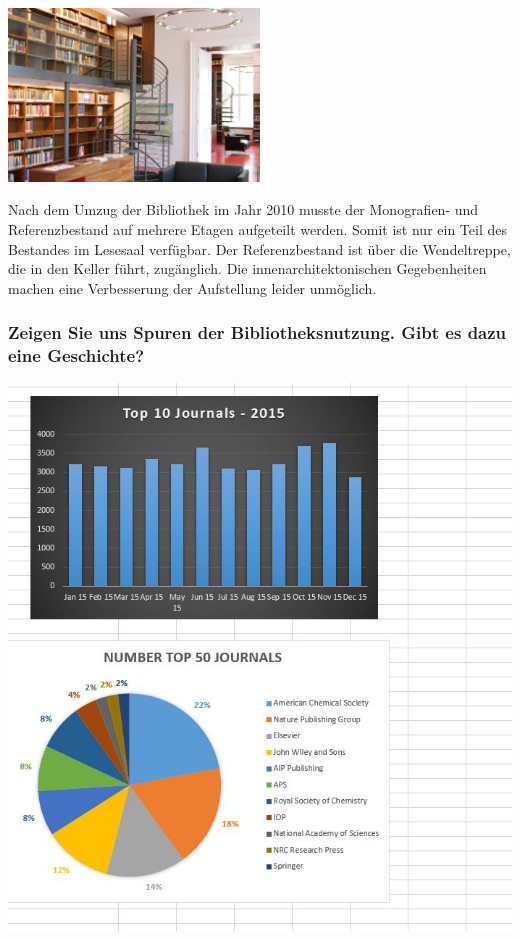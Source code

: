 \begin{center}
\includegraphics[width=0.5\textwidth]{fhi/img/wendeltreppe.jpg}
\end{center}

Nach dem Umzug der Bibliothek im Jahr 2010 musste der Monografien- und
Referenzbestand auf mehrere Etagen aufgeteilt werden. Somit ist nur ein
Teil des Bestandes im Lesesaal verfügbar. Der Referenzbestand ist über
die Wendeltreppe, die in den Keller führt, zugänglich. Die
innenarchitektonischen Gegebenheiten machen eine Verbesserung der
Aufstellung leider unmöglich.

\hypertarget{zeigen-sie-uns-spuren-der-bibliotheksnutzung.-gibt-es-dazu-eine-geschichte}{%
\subsubsection*{Zeigen Sie uns Spuren der Bibliotheksnutzung. Gibt es dazu eine
Geschichte?}\label{zeigen-sie-uns-spuren-der-bibliotheksnutzung.-gibt-es-dazu-eine-geschichte}}

\begin{center}
\includegraphics{fhi/img/nutzungszahlen.jpg}
\end{center}

